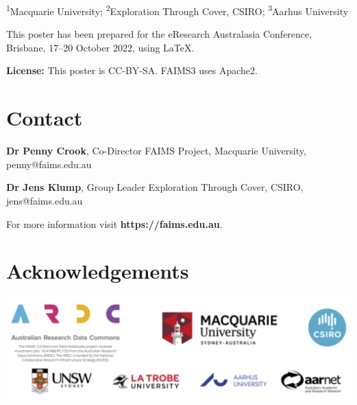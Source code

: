 \documentclass[a0,portrait]{a0poster}
\begin{document}
\begin{multicols}{3}




\textsuperscript{1}Macquarie University; \textsuperscript{2}Exploration Through Cover, CSIRO; \textsuperscript{3}Aarhus University 

\begin{figure}
\end{figure}

This poster has been prepared for the eResearch Australasia Conference, Brisbane, 17–20 October 2022, using \LaTeX{}.

\textbf{License:} This poster is CC-BY-SA. FAIMS3 uses Apache2. 


\section*{Contact}

\textbf{Dr Penny Crook}, Co-Director FAIMS Project, Macquarie University, penny@faims.edu.au

\textbf{Dr Jens Klump}, Group Leader Exploration Through Cover, CSIRO, jens@faims.edu.au

For more information visit \textbf{https://faims.edu.au}.


\columnbreak

 \section*{Acknowledgements}

\begin{center}

\includegraphics[width=\linewidth]{figures/FAIMS-keypartners.png}
\end{center}

\end{multicols}
\end{document}

